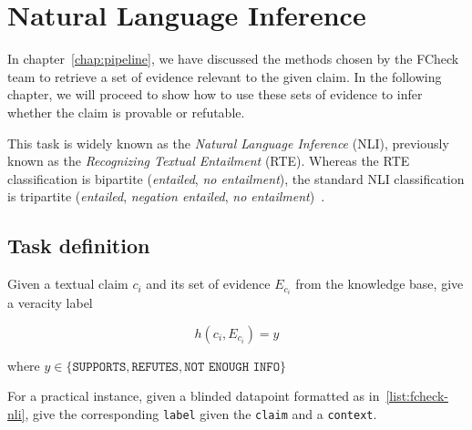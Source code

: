 
\chapter{Natural Language Inference}
\label{chap:nli}

In chapter~\ref{chap:pipeline}, we have discussed the methods chosen by the \textsf{FCheck} team to retrieve a set of evidence relevant to the given claim. In the following chapter, we will proceed to show how to use these sets of evidence to infer whether the claim is provable or refutable.

This task is widely known as the \textit{Natural Language Inference} (NLI), previously known as the \textit{Recognizing Textual Entailment} (RTE). Whereas the RTE classification is bipartite (\textit{entailed}, \textit{no entailment}), the standard NLI classification is tripartite (\textit{entailed}, \textit{negation entailed}, \textit{no entailment})~\cite{overview}.

\section{Task definition}
\label{sec:task}
Given a textual claim $c_i$ and its set of evidence $E_{c_i}$ from the knowledge base, give a veracity label

$$h(c_i,E_{c_i}) = y$$

\noindent where $y\in\{\texttt{SUPPORTS},\texttt{REFUTES},\texttt{NOT ENOUGH INFO}\}$

\vspace{.3em}
For a practical instance, given a blinded datapoint formatted as in~\ref{list:fcheck-nli}, give the corresponding \texttt{label} given the \texttt{claim} and a \texttt{context}.

